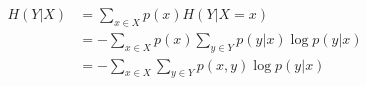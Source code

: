 \begin{align}
	H(Y|X) 	& =  \sum_{x \in X} p(x) H(Y|X=x) \\
		  	& = -\sum_{x \in X} p(x) \sum_{y \in Y} p(y|x) \log p(y|x) \\
			& = -\sum_{x \in X} \sum_{y \in Y} 	p(x,y) \log p(y|x) 
\end{align}